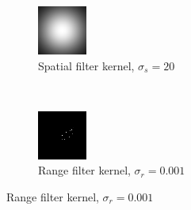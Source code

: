 \documentclass[a4spaper]{article}
\begin{document}
\begin{figure}[ht]
	\vspace{2mm}
	\begin{subfigure}[h]{0.4\textwidth}
		\centering
		\includegraphics[width=\textwidth]{jerry_kernel_spatial_20}
		\caption*{Spatial filter kernel, $\sigma_s = 20$}
	\end{subfigure}
	~ 
	\begin{subfigure}[h]{0.4\textwidth}
		\centering
		\includegraphics[width=\textwidth]{jerry_kernel_range_0-001}
		\caption*{Range filter kernel, $\sigma_r = 0.001$}
	\end{subfigure}	
	

\end{figure}
\end{document}

